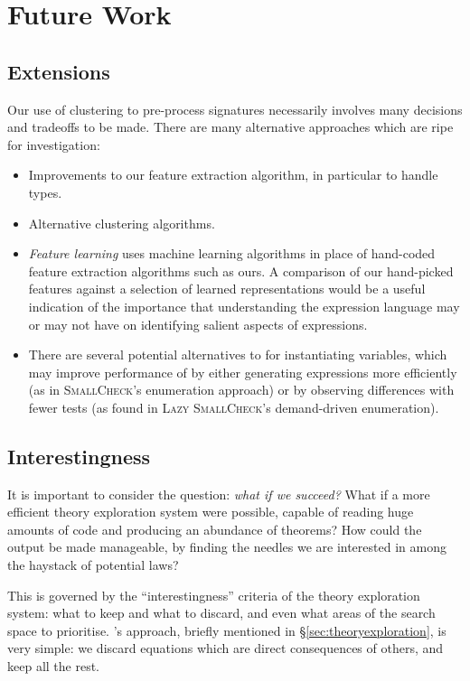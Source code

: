 \section{Future Work}
\label{sec:future}

\subsection{Extensions}
\label{sec:preprocessing}

Our use of clustering to pre-process \qcheck{} signatures necessarily involves many decisions and tradeoffs to be made. There are many alternative approaches which are ripe for investigation:

\begin{itemize}
  \item Improvements to our feature extraction algorithm, in particular to handle types.
  \item Alternative clustering algorithms.
  \item \emph{Feature learning} uses machine learning algorithms in place of hand-coded feature extraction algorithms such as ours. A comparison of our hand-picked features against a selection of learned representations would be a useful indication of the importance that understanding the expression language may or may not have on identifying salient aspects of expressions.
  \item There are several potential alternatives to \qcheck{} for instantiating variables, which may improve performance of \qspec{} by either generating expressions more efficiently (as in \textsc{SmallCheck}'s enumeration approach) or by observing differences with fewer tests (as found in \textsc{Lazy SmallCheck}'s demand-driven enumeration).
\end{itemize}

\subsection{Interestingness}
\label{sec:interestingness}

It is important to consider the question: \emph{what if we succeed?} What if a more efficient theory exploration system were possible, capable of reading huge amounts of code and producing an abundance of theorems? How could the output be made manageable, by finding the needles we are interested in among the haystack of potential laws?

This is governed by the ``interestingness'' criteria of the theory exploration system: what to keep and what to discard, and even what areas of the search space to prioritise. \qspec{}'s approach, briefly mentioned in \S \ref{sec:theoryexploration}, is very simple: we discard equations which are direct consequences of others, and keep all the rest.

